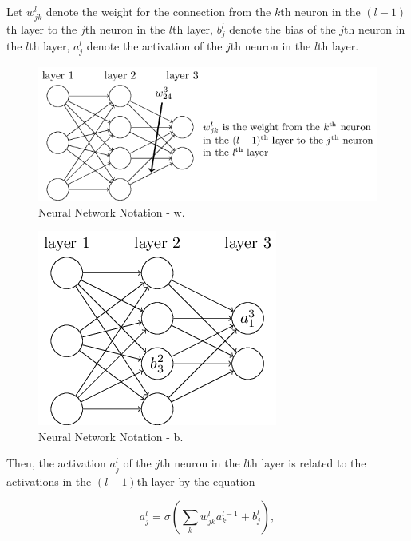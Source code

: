 \documentclass[]{book}
\begin{document}
Let \(w^{l}_{jk}\) denote the weight for the connection from the \(k\)th
neuron in the \((l-1)\)th layer to the \(j\)th neuron in the \(l\)th
layer, \(b^l_j\) denote the bias of the \(j\)th neuron in the \(l\)th
layer, \(a^l_j\) denote the activation of the \(j\)th neuron in the
\(l\)th layer.

\begin{figure}

{\centering \includegraphics[width=1\linewidth]{fig/02_tikz16} 

}

\caption{Neural Network Notation - w.}\label{fig:bkpg-mv-notation-w}
\end{figure}\begin{figure}

{\centering \includegraphics[width=0.5\linewidth]{fig/02_tikz17} 

}

\caption{Neural Network Notation - b.}\label{fig:bkpg-mv-notation-b}
\end{figure}

Then, the activation \(a^l_j\) of the \(j\)th neuron in the \(l\)th
layer is related to the activations in the \((l-1)\)th layer by the
equation

\begin{equation}
a^{l}_j = \sigma\left( \sum_k w^{l}_{jk} a^{l-1}_k + b^l_j \right), \label{eq:bkpg-nvac}
\end{equation}
\end{document}
